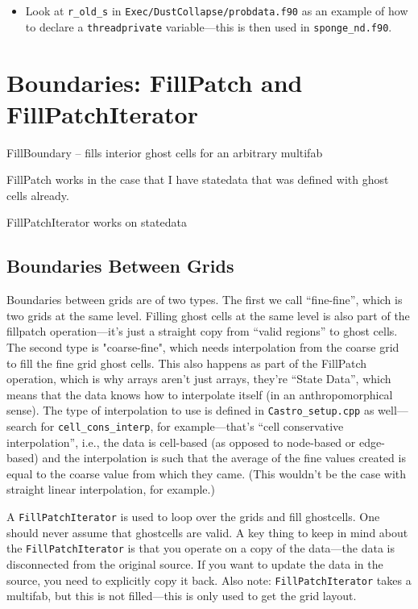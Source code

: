 \begin{itemize}
\begin{itemize}
\item Look at {\tt r\_old\_s} in {\tt Exec/DustCollapse/probdata.f90} as an
  example of how to declare a {\tt threadprivate} variable---this is then used
  in {\tt sponge\_nd.f90}.

\end{itemize}

\end{itemize}



\section{Boundaries: FillPatch and FillPatchIterator}

FillBoundary -- fills interior ghost cells for an arbitrary multifab

FillPatch works in the case that I have statedata that was defined
with ghost cells already.

FillPatchIterator works on statedata


\subsection{Boundaries Between Grids}
Boundaries between grids are of two types. The first we call
``fine-fine'', which is two grids at the same level.  Filling ghost
cells at the same level is also part of the fillpatch operation---it's
just a straight copy from ``valid regions'' to ghost cells. The second
type is "coarse-fine", which needs interpolation from the coarse grid
to fill the fine grid ghost cells.  This also happens as part of the
FillPatch operation, which is why arrays aren't just arrays, they're
``State Data'', which means that the data knows how to interpolate
itself (in an anthropomorphical sense).  The type of interpolation to
use is defined in {\tt Castro\_setup.cpp} as well---search for
{\tt cell\_cons\_interp}, for example---that's ``cell conservative
interpolation'', i.e., the data is cell-based (as opposed to node-based
or edge-based) and the interpolation is such that the average of the
fine values created is equal to the coarse value from which they came.
(This wouldn't be the case with straight linear interpolation, for
example.)

A {\tt FillPatchIterator} is used to loop over the grids and fill
ghostcells.  One should never assume that ghostcells are valid.  A key
thing to keep in mind about the {\tt FillPatchIterator} is that you
operate on a copy of the data---the data is disconnected from the
original source.  If you want to update the data in the source,
you need to explicitly copy it back.  Also note: {\tt FillPatchIterator}
takes a multifab, but this is not filled---this is only used to
get the grid layout.  

